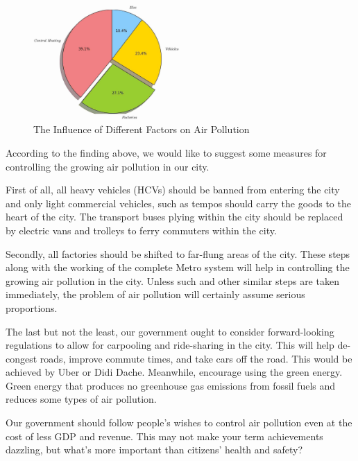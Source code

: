 \documentclass[a4paper,11pt]{article}
\begin{document}
\begin{figure}[h]%
\centering %
\includegraphics[width=0.50\textwidth]{./Pic/pie.jpg}
\caption{The Influence of Different Factors on Air Pollution}
\label{fig:pie}       %
\end{figure}


\par According to the finding above, we would like to suggest some measures for controlling the growing air pollution in our city.

\par First of all, all heavy vehicles (HCVs) should be banned from entering the city and only light commercial vehicles, such as tempos should carry the goods to the heart of the city. The transport buses plying within the city should be replaced by electric vans and trolleys to ferry commuters within the city. 

\par Secondly, all factories should be shifted to far-flung areas of the city. These steps along with the working of the complete Metro system will help in controlling the growing air pollution in the city. Unless such and other similar steps are taken immediately, the problem of air pollution will certainly assume serious proportions. 

\par The last but not the least, our government ought to consider forward-looking regulations to allow for carpooling and ride-sharing in the city. This will help de-congest roads, improve commute times, and take cars off the road. This would be achieved by Uber or Didi Dache. Meanwhile, encourage using the green energy. Green energy that produces no greenhouse gas emissions from fossil fuels and reduces some types of air pollution.
\par Our government should follow people's wishes to control air pollution even at the cost of less GDP and revenue. This may not make your term achievements dazzling, but what's more important than citizens' health and safety?
\end{document}
